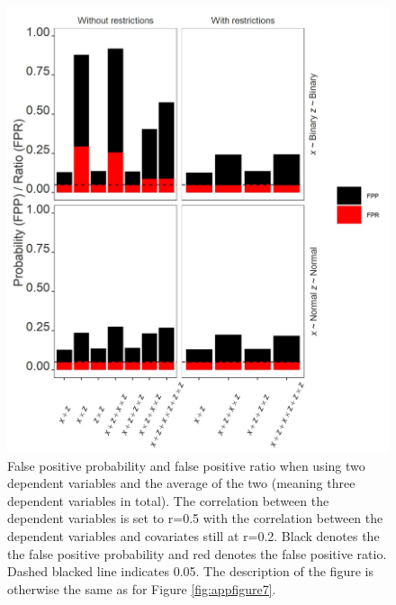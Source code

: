 \begin{landscape}
\scriptsize

\end{landscape}



\begin{figure}[hbt!]
\includegraphics{R/Analysis/Result/Figures/Figure3SIBon.jpeg}
\centering
\caption{False positive probability and false positive ratio when using two dependent variables and the average of the two (meaning three dependent variables in total). The correlation between the dependent variables is set to r=0.5 with the correlation between the dependent variables and covariates still at r=0.2. Black denotes the the false positive probability and red denotes the false positive ratio. Dashed blacked line indicates 0.05. The description of the figure is otherwise the same as for Figure \ref{fig:appfigure7}.}
\label{fig:appfigure9}
\end{figure}



\begin{landscape}
\scriptsize

\end{landscape}

